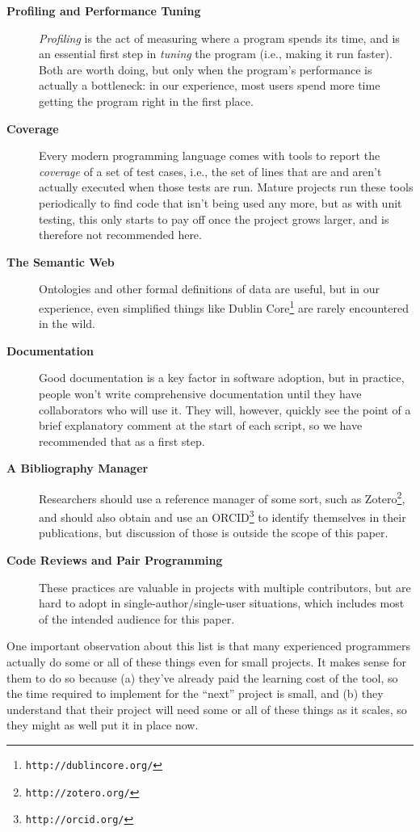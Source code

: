 \documentclass[10pt]{article}
\newcommand{\withurl}[2]{{#1}\footnote{\texttt{#2}}}
\begin{document}
\begin{description}
\item[\textbf{Profiling and Performance Tuning}]
\emph{Profiling} is the act of measuring where a program spends its
time, and is an essential first step in \emph{tuning} the program (i.e.,
making it run faster). Both are worth doing, but only when the program's
performance is actually a bottleneck: in our experience, most users
spend more time getting the program right in the first place.

\item[\textbf{Coverage}]
Every modern programming language comes with tools to report the
\emph{coverage} of a set of test cases, i.e., the set of lines that are
and aren't actually executed when those tests are run. Mature projects
run these tools periodically to find code that isn't being used any
more, but as with unit testing, this only starts to pay off once the
project grows larger, and is therefore not recommended here.

\item[\textbf{The Semantic Web}] Ontologies and other formal
  definitions of data are useful, but in our experience, even
  simplified things like \withurl{Dublin Core}{http://dublincore.org/}
  are rarely encountered in the wild.

\item[\textbf{Documentation}]
Good documentation is a key factor in software adoption, but in
practice, people won't write comprehensive documentation until they have
collaborators who will use it. They will, however, quickly see the point
of a brief explanatory comment at the start of each script, so we have
recommended that as a first step.

\item[\textbf{A Bibliography Manager}] Researchers should use a
  reference manager of some sort, such as
  \withurl{Zotero}{http://zotero.org/}, and should also obtain and use an
  \withurl{ORCID}{http://orcid.org/} to identify themselves in their
  publications, but discussion of those is outside the scope of this
  paper.

\item[\textbf{Code Reviews and Pair Programming}]
These practices are valuable in projects with multiple contributors, but
are hard to adopt in single-author/single-user situations, which
includes most of the intended audience for this paper.

\end{description}

One important observation about this list is that many experienced
programmers actually do some or all of these things even for small
projects. It makes sense for them to do so because (a) they've already
paid the learning cost of the tool, so the time required to implement
for the ``next'' project is small, and (b) they understand that their
project will need some or all of these things as it scales, so they
might as well put it in place now.
\end{document}
